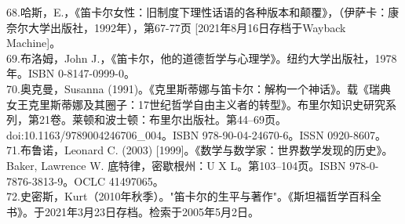 68.哈斯，E.，《笛卡尔女性：旧制度下理性话语的各种版本和颠覆》，（伊萨卡：康奈尔大学出版社，1992年），第67-77页 [2021年8月16日存档于Wayback Machine]。\\
69.布洛姆，John J.，《笛卡尔，他的道德哲学与心理学》。纽约大学出版社，1978年。ISBN 0-8147-0999-0。\\
70.奥克曼，Susanna (1991)。《克里斯蒂娜与笛卡尔：解构一个神话》。载《瑞典女王克里斯蒂娜及其圈子：17世纪哲学自由主义者的转型》。布里尔知识史研究系列，第21卷。莱顿和波士顿：布里尔出版社。第44–69页。doi:10.1163/9789004246706_004。ISBN 978-90-04-24670-6。ISSN 0920-8607。\\
71.布鲁诺，Leonard C. (2003) [1999]。《数学与数学家：世界数学发现的历史》。Baker, Lawrence W. 底特律，密歇根州：U X L。第103–104页。ISBN 978-0-7876-3813-9。OCLC 41497065。\\
72.史密斯，Kurt（2010年秋季）。"笛卡尔的生平与著作"。《斯坦福哲学百科全书》。于2021年3月23日存档。检索于2005年5月2日。\\